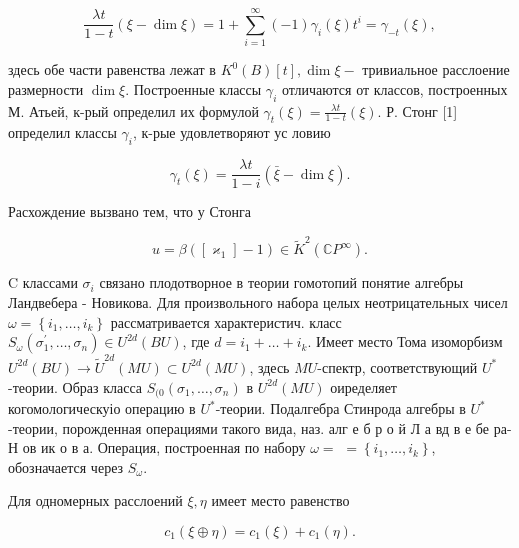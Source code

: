 \documentclass[10pt]{article}
\begin{document}
\[

\frac{\lambda t}{1-t}(\xi-\operatorname{dim} \xi)=1+\sum_{i=1}^{\infty}(-1) \gamma_{i}(\xi) t^{i}=\gamma_{-t}(\xi),

\]



здесь обе части равенства лежат в $K^{0}(B)[t], \operatorname{dim} \xi-$ тривиальное расслоение размерности $\operatorname{dim} \xi$. Построенные классы $\gamma_{i}$ отличаются от классов, построенных М. Атьей, к-рый определил их формулой $\gamma_{t}(\xi)=\frac{\lambda t}{1-t}(\xi)$. Р. Стонг [1] определил классы $\gamma_{i}$, к-рые удовлетворяют ус ловию



\[

\gamma_{t}(\xi)=\frac{\lambda t}{1-i}(\bar{\xi}-\operatorname{dim} \xi) .

\]



Расхождение вызвано тем, что у Стонга



\[

u=\beta\left(\left[\varkappa_{1}\right]-1\right) \in \tilde{K}^{2}\left(\mathbb{C} P^{\infty}\right) .

\]



$\mathrm{C}$ классами $\sigma_{i}$ связано плодотворное в теории гомотопий понятие алгебры Ландвебера - Новикова. Для произвольного набора целых неотрицательных чисел $\omega=\left\{i_{1}, \ldots, i_{k}\right\}$ рассматривается характеристич. класс $S_{\omega}\left(\sigma_{1}^{\prime}, \ldots, \sigma_{n}\right) \in U^{2 d}(B U)$, где $d=i_{1}+\ldots+i_{k}$. Имеет место Тома изоморбизм $U^{2 d}(B U) \longrightarrow \tilde{U}^{2 d}(M U) \subset U^{2 d}(M U)$, здесь $M U$-спектр, соответствующий $U^{*}$-теории. Образ класса $S_{(0}\left(\sigma_{1}, \ldots, \sigma_{n}\right)$ в $U^{2 d}(M U)$ оиределяет когомологическуіо операцию в $U^{*}$-теории. Подалгебра Стинрода алгебры в $U^{*}$-теории, порожденная операциями такого вида, наз. алг е б р о й Л а вд в е бе ра-Н ов ик о в а. Операция, построенная по набору $\omega=$ $=\left\{i_{1}, \ldots, i_{k}\right\}$, обозначается через $S_{\omega}$.



Для одномерных расслоений $\xi, \eta$ имеет место равенство



\[

c_{1}(\xi \oplus \eta)=c_{1}(\xi)+c_{1}(\eta) .

\]
\end{document}
